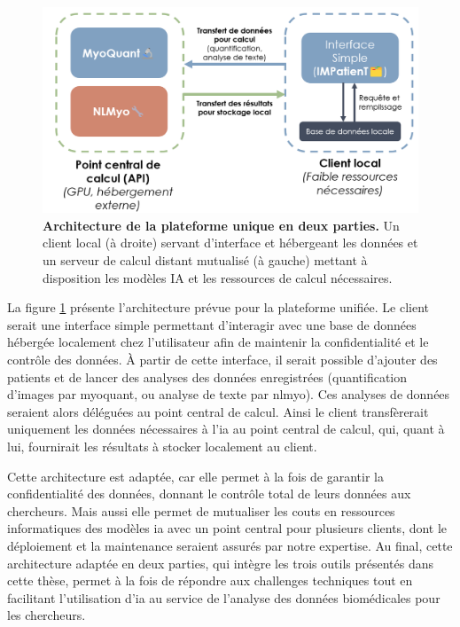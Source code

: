  \begin{figure}[htbp]
 \centering
 \includegraphics[width=1\textwidth]{figures/perspective_unique.png}
 \caption[Architecture de la plateforme unique en deux parties]{\textbf{Architecture de la plateforme unique en deux parties.} Un client local (à droite) servant d'interface et hébergeant les données et un serveur de calcul distant mutualisé (à gauche) mettant à disposition les modèles IA et les ressources de calcul nécessaires.}
 \label{fig:perspective_unique}
\end{figure}

La figure \ref{fig:perspective_unique} présente l'architecture prévue pour la plateforme unifiée. Le client serait une interface simple permettant d'interagir avec une base de données hébergée localement chez l'utilisateur afin de maintenir la confidentialité et le contrôle des données. À partir de cette interface, il serait possible d'ajouter des patients et de lancer des analyses des données enregistrées (quantification d'images par \gls{myoquant}, ou analyse de texte par \gls{nlmyo}). Ces analyses de données seraient alors déléguées au point central de calcul. Ainsi le client transfèrerait uniquement les données nécessaires à l'\gls{ia} au point central de calcul, qui, quant à lui, fournirait les résultats à stocker localement au client.

Cette architecture est adaptée, car elle permet à la fois de garantir la confidentialité des données, donnant le contrôle total de leurs données aux chercheurs. Mais aussi elle permet de mutualiser les couts en ressources informatiques des modèles \gls{ia} avec un point central pour plusieurs clients, dont le déploiement et la maintenance seraient assurés par notre expertise. Au final, cette architecture adaptée en deux parties, qui intègre les trois outils présentés dans cette thèse, permet à la fois de répondre aux challenges techniques tout en facilitant l'utilisation d'\gls{ia} au service de l'analyse des données biomédicales pour les chercheurs.
